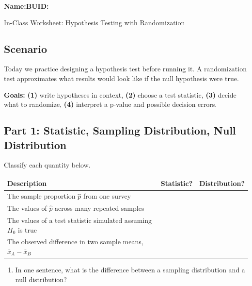 \documentclass{article}
\newcommand{\blankline}[1]{\underline{\hspace{#1}}}
\begin{document}
\noindent\textbf{Name:}\blankline{2.25in}\hfill\textbf{BUID:}\blankline{1.55in}\newline

\begin{center}
 \Large In-Class Worksheet: Hypothesis Testing with Randomization
\end{center}

\subsection*{Scenario}
Today we practice designing a hypothesis test before running it. A randomization test approximates what results would look like if the null hypothesis were true.

\medskip
\noindent\textbf{Goals:} \textbf{(1)} write hypotheses in context, \textbf{(2)} choose a test statistic, \textbf{(3)} decide what to randomize, \textbf{(4)} interpret a p-value and possible decision errors.

\subsection*{Part 1: Statistic, Sampling Distribution, Null Distribution}
Classify each quantity below.

\begin{center}
\renewcommand{\arraystretch}{1.45}
\begin{tabularx}{\textwidth}{Xcc}
\toprule
\textbf{Description} & \textbf{Statistic?} & \textbf{Distribution?} \\
\midrule
The sample proportion $\hat p$ from one survey & & \\[1.6em]
The values of $\hat p$ across many repeated samples & & \\[1.6em]
The values of a test statistic simulated assuming $H_0$ is true & & \\[1.6em]
The observed difference in two sample means, $\bar{x}_A-\bar{x}_B$ & & \\
\bottomrule
\end{tabularx}
\end{center}

\begin{enumerate}[label={\bfseries (\Alph*)},itemsep=.8em]
\item In one sentence, what is the difference between a sampling distribution and a null distribution? \\[4em]
\end{enumerate}
\end{document}

